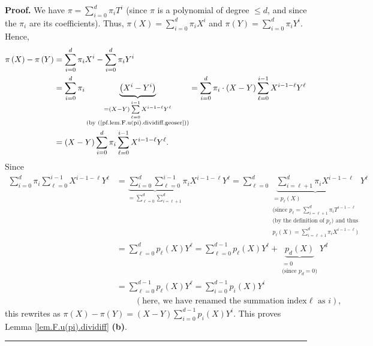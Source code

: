 \documentclass[numbers=enddot,12pt,final,onecolumn,notitlepage]{scrartcl}%
\theoremstyle{definition}
\newenvironment{proof}[1][Proof]{\noindent\textbf{#1.} }{\ \rule{0.5em}{0.5em}}
\let\sumnonlimits\sum
\renewcommand{\sum}{\sumnonlimits\limits}
\begin{document}
\begin{proof}
We have $\pi=\sum_{i=0}^{d}\pi_{i}T^{i}$ (since $\pi$ is a polynomial of
degree $\leq d$, and since the $\pi_{i}$ are its coefficients). Thus,
$\pi\left(  X\right)  =\sum_{i=0}^{d}\pi_{i}X^{i}$ and $\pi\left(  Y\right)
=\sum_{i=0}^{d}\pi_{i}Y^{i}$. Hence,%
\begin{align*}
\pi\left(  X\right)  -\pi\left(  Y\right)   &  =\sum_{i=0}^{d}\pi_{i}%
X^{i}-\sum_{i=0}^{d}\pi_{i}Y^{i}\\
&  =\sum_{i=0}^{d}\pi_{i}\underbrace{\left(  X^{i}-Y^{i}\right)
}_{\substack{=\left(  X-Y\right)  \sum_{\ell=0}^{i-1}X^{i-1-\ell}Y^{\ell
}\\\text{(by (\ref{pf.lem.F.u(pi).dividiff.geoser}))}}}=\sum_{i=0}^{d}\pi
_{i}\cdot\left(  X-Y\right)  \sum_{\ell=0}^{i-1}X^{i-1-\ell}Y^{\ell}\\
&  =\left(  X-Y\right)  \sum_{i=0}^{d}\pi_{i}\sum_{\ell=0}^{i-1}X^{i-1-\ell
}Y^{\ell}.
\end{align*}
Since%
\begin{align*}
\sum_{i=0}^{d}\pi_{i}\sum_{\ell=0}^{i-1}X^{i-1-\ell}Y^{\ell}  &
=\underbrace{\sum_{i=0}^{d}\sum_{\ell=0}^{i-1}}_{=\sum_{\ell=0}^{d}%
\sum_{i=\ell+1}^{d}}\pi_{i}X^{i-1-\ell}Y^{\ell}=\sum_{\ell=0}^{d}%
\underbrace{\sum_{i=\ell+1}^{d}\pi_{i}X^{i-1-\ell}}_{\substack{=p_{\ell
}\left(  X\right)  \\\text{(since }p_{\ell}=\sum_{i=\ell+1}^{d}\pi
_{i}T^{i-1-\ell}\\\text{(by the definition of }p_{\ell}\text{) and
thus}\\p_{\ell}\left(  X\right)  =\sum_{i=\ell+1}^{d}\pi_{i}X^{i-1-\ell
}\text{)}}}Y^{\ell}\\
&  =\sum_{\ell=0}^{d}p_{\ell}\left(  X\right)  Y^{\ell}=\sum_{\ell=0}%
^{d-1}p_{\ell}\left(  X\right)  Y^{\ell}+\underbrace{p_{d}\left(  X\right)
}_{\substack{=0\\\text{(since }p_{d}=0\text{)}}}Y^{d}\\
&  =\sum_{\ell=0}^{d-1}p_{\ell}\left(  X\right)  Y^{\ell}=\sum_{i=0}%
^{d-1}p_{i}\left(  X\right)  Y^{i}\\
&  \ \ \ \ \ \ \ \ \ \ \left(  \text{here, we have renamed the summation index
}\ell\text{ as }i\right)  ,
\end{align*}
this rewrites as $\pi\left(  X\right)  -\pi\left(  Y\right)  =\left(
X-Y\right)  \sum_{i=0}^{d-1}p_{i}\left(  X\right)  Y^{i}$. This proves Lemma
\ref{lem.F.u(pi).dividiff} \textbf{(b)}.
\end{proof}
\end{document}
